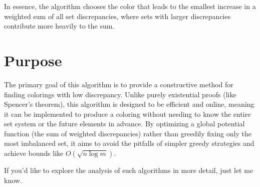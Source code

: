 \documentclass[11pt]{article}
\begin{document}
In essence, the algorithm chooses the color that leads to the smallest
increase in a weighted sum of all set discrepancies, where sets with
larger discrepancies contribute more heavily to the sum.

\section{Purpose}

The primary goal of this algorithm is to provide a constructive method
for finding colorings with low discrepancy. Unlike purely existential
proofs (like Spencer's theorem), this algorithm is designed to be
efficient and online, meaning it can be implemented to produce a
coloring without needing to know the entire set system or the future
elements in advance. By optimizing a global potential function (the sum
of weighted discrepancies) rather than greedily fixing only the most
imbalanced set, it aims to avoid the pitfalls of simpler greedy
strategies and achieve bounds like \(O(\sqrt{n \log m})\).

If you'd like to explore the analysis of such algorithms in more detail,
just let me know.
\end{document}
